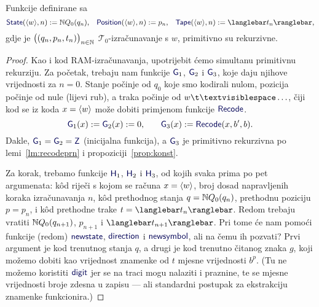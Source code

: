 \begin{lema}\label{lm:StateHeadTapeprn}
Funkcije definirane sa
\begin{equation}
    \f{State}(\kr w,n):=\N Q_0(q_n)\text,\quad
    \f{Position}(\kr w,n):=p_n\text,\quad
    \f{Tape}(\kr w,n):=\knk{t_n}\text,
\end{equation}
gdje je $\bigl((q_n,p_n,t_n)\bigr)_{n\in{\mathbb N}}$
$\mathcal T_0$-izračunavanje s $w$,
primitivno su rekurzivne.
\end{lema}
\begin{proof}
Kao i kod RAM-izračunavanja, upotrijebit ćemo simultanu primitivnu rekurziju. Za početak, trebaju nam funkcije $\f G_1$, $\f G_2$ i $\f G_3$, koje daju njihove vrijednosti za $n=0$. Stanje počinje od $q_0$ koje smo kodirali nulom, pozicija počinje od nule (lijevi rub), a traka počinje od $w\bl\ldots$, čiji kod se iz koda $x=\langle w\rangle$ može dobiti primjenom funkcije $\f{Recode}$.
\begin{equation}
    \f G_1(x):=\f G_2(x):=0\text,\qquad
    \f G_3(x):=\f{Recode}(x,b',b)\text.
\end{equation}
Dakle, $\f G_1=\f G_2=\f Z$ (inicijalna funkcija), a $\f G_3$ je primitivno rekurzivna po lemi~\ref{lm:recodeprn} i propoziciji~\ref{prop:konst}.

Za korak, trebamo funkcije $\f H_1$, $\f H_2$ i $\f H_3$, od kojih svaka prima po pet argumenata: k\^od riječi s kojom se računa $x=\langle w\rangle$, broj dosad napravljenih koraka izračunavanja $n$, k\^od prethodnog stanja $q={\mathbb N} Q_0(q_n)$, prethodnu poziciju $p=p_n$, i k\^od prethodne trake $t=\knk{t_n}$. Redom trebaju vratiti ${\mathbb N} Q_0(q_{n+1})$, $p_{n+1}$ i $\knk{t_{n+1}}$. Pri tome će nam pomoći funkcije (redom) $\f{newstate}$, $\f{direction}$ i $\f{newsymbol}$, ali na čemu ih pozvati? Prvi argument je kod trenutnog stanja $q$, a drugi je kod trenutno čitanog znaka $g$, koji možemo dobiti kao vrijednost znamenke od $t$ mjesne vrijednosti $b^p$. (Tu ne možemo koristiti $\f{digit}$ jer se na traci mogu nalaziti i praznine, te se mjesne vrijednosti broje zdesna u zapisu --- ali standardni postupak za ekstrakciju znamenke funkcionira.)


\end{proof}
